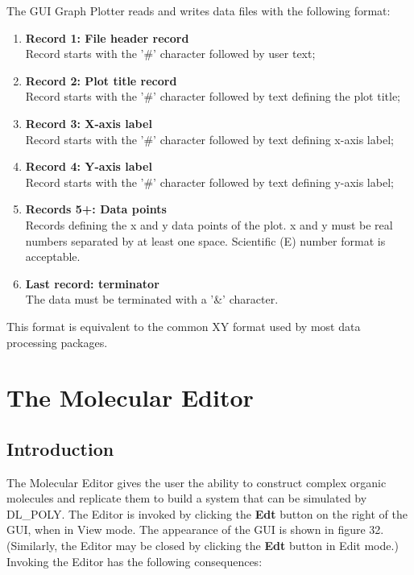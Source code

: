 The GUI Graph Plotter reads and writes data files with the following
format:
\begin{enumerate}
\item {\bf Record 1: File header record}\\
Record starts with the '\#' character followed by user text;
\item {\bf Record 2: Plot title record}\\
Record starts with the '\#' character followed by text defining
the plot title;
\item {\bf Record 3: X-axis label}\\
Record starts with the '\#' character followed by text defining
x-axis label;
\item {\bf Record 4: Y-axis label}\\
Record starts with the '\#' character followed by text defining
y-axis label;
\item {\bf Records 5+: Data points}\\
Records defining the x and y data points of the plot. x and y must be
real numbers separated by at least one space. Scientific (E) number format
is acceptable.
\item {\bf Last record: terminator}\\
The data must be terminated with a '\&' character.
\end{enumerate}
This format is equivalent to the common XY format used by most data
processing packages.

\section{The Molecular Editor}

\subsection{Introduction}

The Molecular Editor gives the user the ability to construct complex organic
molecules and replicate them to build a system that can be simulated by
DL\_POLY.  The Editor is invoked by clicking the {\bf Edt} button on the right
of the GUI, when in View mode. The appearance of the GUI is shown in figure
32.  (Similarly, the Editor may be closed by clicking the {\bf Edt} button in
Edit mode.)  Invoking the Editor has the following consequences:

